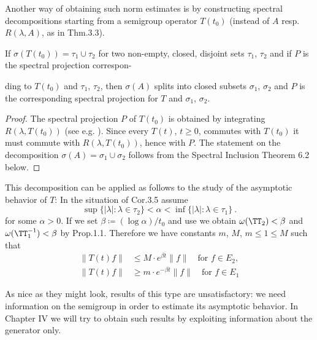 Another way of obtaining such norm estimates is by constructing spectral decompositions starting from a semigroup operator $T(t_{0})$ (instead of $A$ resp. $R(\lambda,A)$, as in Thm.3.3).

\begin{corollary}\label{cor:a3-3.5}

If $\sigma(T(t_{0})) = \tau_{1} \cup \tau_{2}$ for two non-empty, closed, disjoint sets $\tau_{1}$, $\tau_{2}$ and if $P$ is the spectral projection correspon-



ding to $T(t_{0})$ and $\tau_{1}$, $\tau_{2}$, then $\sigma(A)$ splits into closed subsets $\sigma_{1}$, $\sigma_{2}$ and $P$ is the corresponding spectral projection for $T$ and $\sigma_{1}$, $\sigma_{2}$.
\end{corollary}

\begin{proof}
The spectral projection $P$ of $T(t_{0})$ is obtained by integrating $R(\lambda,T(t_{0}))$ (see e.g. \citet[Section VII.3]{dunfordschwartz:1958}).
Since every $T(t)$, $t \geq 0$, commutes with $T(t_{0})$ it must commute with $R(\lambda,T(t_{0}))$, hence with $P$.
The statement on the decomposition $\sigma(A) = \sigma_{1} \cup \sigma_{2}$ follows from the Spectral Inclusion Theorem 6.2 below.
\end{proof}

This decomposition can be applied as follows to the study of the asymptotic behavior of $T$: In the situation of Cor.3.5 assume
\[
\sup \{|\lambda| \colon \lambda \in \tau_{2}\} < \alpha < \inf \{|\lambda| \colon \lambda \in \tau_{1}\}~.
\]
for some $\alpha > 0$. If we set $\beta \coloneqq (\log\alpha)/t_{0}$ and use \citet[Chap.I,Thm.6.5]{pazy:1983} we obtain $\omega(\TT_{2}) < \beta$ and $\omega(\TT_{1}^{-1}) < \beta$ by Prop.1.1.
Therefore we have constants $m$, $M$, $m \le 1 \le M $ such that
\begin{align*}
\|T(t)f\| &\leq M \cdot e^{\beta t}\|f\| \quad \text{for } f \in E_{2}, \\
\|T(t)f\| &\geq m \cdot e^{-\beta t}\|f\| \quad \text{for } f \in E_{1}
\end{align*}

As nice as they might look, results of this type are unsatisfactory: we need information on the semigroup in order to estimate its asymptotic behavior.
In Chapter IV we will try to obtain such results by exploiting information about the generator only.

